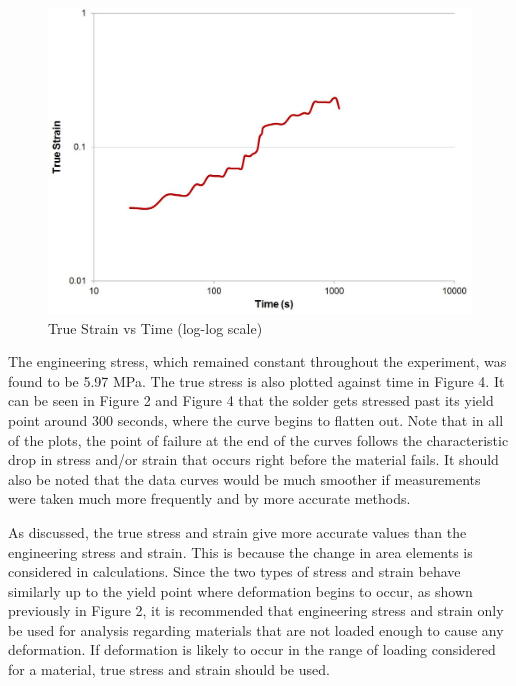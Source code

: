 \documentclass[12pt]{article}
\begin{document}
\begin{figure}[htbp] %
   \centering
   \includegraphics[width=\linewidth]{t_strain_vs_time_log.jpg} 
   \caption{True Strain vs Time (log-log scale)}
\end{figure}
\bigskip


The engineering stress, which remained constant throughout the experiment, was found to be 5.97 MPa. The true stress is also plotted against time in Figure 4. It can be seen in Figure 2 and Figure 4 that the solder gets stressed past its yield point around 300 seconds, where the curve begins to flatten out. Note that in all of the plots, the point of failure at the end of the curves follows the characteristic drop in stress and/or strain that occurs right before the material fails. It should also be noted that the data curves would be much smoother if measurements were taken much more frequently and by more accurate methods.
\bigskip

As discussed, the true stress and strain give more accurate values than the engineering stress and strain. This is because the change in area elements is considered in calculations. Since the two types of stress and strain behave similarly up to the yield point where deformation begins to occur, as shown previously in Figure 2, it is recommended that engineering stress and strain only be used for analysis regarding materials that are not loaded enough to cause any deformation. If deformation is likely to occur in the range of loading considered for a material, true stress and strain should be used. 

\newpage
\end{document}
